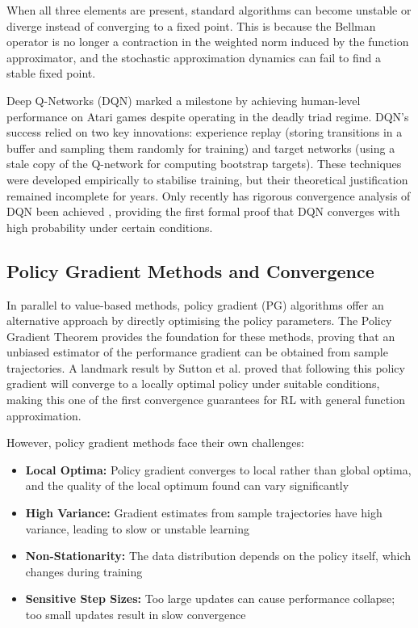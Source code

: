 \documentclass[12pt,a4paper]{report}
\begin{document}
When all three elements are present, standard algorithms can become unstable or diverge instead of converging to a fixed point. This is because the Bellman operator is no longer a contraction in the weighted norm induced by the function approximator, and the stochastic approximation dynamics can fail to find a stable fixed point.

Deep Q-Networks (DQN) \cite{mnih2015humanlevel} marked a milestone by achieving human-level performance on Atari games despite operating in the deadly triad regime. DQN's success relied on two key innovations: experience replay (storing transitions in a buffer and sampling them randomly for training) and target networks (using a stale copy of the Q-network for computing bootstrap targets). These techniques were developed empirically to stabilise training, but their theoretical justification remained incomplete for years. Only recently has rigorous convergence analysis of DQN been achieved \cite{zhang2023convergence}, providing the first formal proof that DQN converges with high probability under certain conditions.

\subsection{Policy Gradient Methods and Convergence}

In parallel to value-based methods, policy gradient (PG) algorithms offer an alternative approach by directly optimising the policy parameters. The Policy Gradient Theorem \cite{sutton1999policy} provides the foundation for these methods, proving that an unbiased estimator of the performance gradient can be obtained from sample trajectories. A landmark result by Sutton et al. \cite{sutton1999policy} proved that following this policy gradient will converge to a locally optimal policy under suitable conditions, making this one of the first convergence guarantees for RL with general function approximation.

However, policy gradient methods face their own challenges:
\begin{itemize}
    \item \textbf{Local Optima:} Policy gradient converges to local rather than global optima, and the quality of the local optimum found can vary significantly
    \item \textbf{High Variance:} Gradient estimates from sample trajectories have high variance, leading to slow or unstable learning
    \item \textbf{Non-Stationarity:} The data distribution depends on the policy itself, which changes during training
    \item \textbf{Sensitive Step Sizes:} Too large updates can cause performance collapse; too small updates result in slow convergence
\end{itemize}
\end{document}
